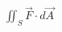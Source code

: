 \documentclass[preview]{standalone}
\begin{document}
\begin{align*}
\iint_S \vec{F} \cdot d\vec{A}
\end{align*}
\end{document}
